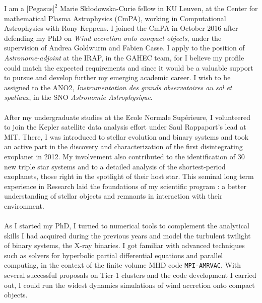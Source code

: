 \documentclass[12pt]{letter}
\begin{document}
\begin{letter} {}
\hspace*{0.5cm} I am a $[$Pegasus$]^2$ Marie Sk\l{}odowska-Curie fellow in KU Leuven, at the Center for mathematical Plasma Astrophysics (CmPA), working in Computational Astrophysics with Rony Keppens. I joined the CmPA in October 2016 after defending my PhD on \textit{Wind accretion onto compact objects}, under the supervision of Andrea Goldwurm and Fabien Casse. I apply to the position of \textit{Astronome-adjoint} at the IRAP, in the GAHEC team, for I believe my profile could match the expected requirements and since it would be a valuable support to pursue and develop further my emerging academic career. I wish to be assigned to the ANO2, \textit{Instrumentation des grands observatoires au sol et spatiaux}, in the SNO \textit{Astronomie Astrophysique}. \\ \\
\hspace*{0.5cm} After my undergraduate studies at the Ecole Normale Sup\'erieure, I volunteered to join the Kepler satellite data analysis effort under Saul Rappaport's lead at MIT. There, I was introduced to stellar evolution and binary systems and took an active part in the discovery and characterization of the first disintegrating exoplanet in 2012. My involvement also contributed to the identification of 30 new triple star systems and to a detailed analysis of the shortest-period exoplanets, those right in the spotlight of their host star. This seminal long term experience in Research laid the foundations of my scientific program : a better understanding of stellar objects and remnants in interaction with their environment.\\ \\
\hspace*{0.5cm} As I started my PhD, I turned to numerical tools to complement the analytical skills I had acquired during the previous years and model the turbulent twilight of binary systems, the X-ray binaries. I got familiar with advanced techniques such as solvers for hyperbolic partial differential equations and parallel computing, in the context of the finite volume MHD code \texttt{MPI-AMRVAC}. With several successful proposals on Tier-1 clusters and the code development I carried out, I could run the widest dynamics simulations of wind accretion onto compact objects.\\

\newpage 



\end{letter}
\end{document}
